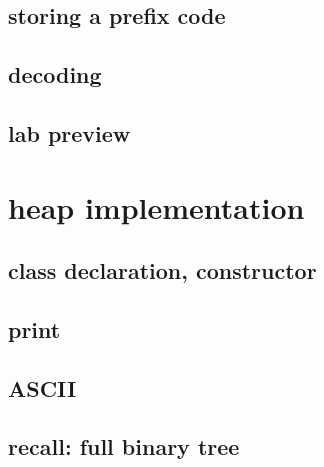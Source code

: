 



\subsection{storing a prefix code}



\subsection{decoding}



\subsection{lab preview}



\section{heap implementation}



\subsection{class declaration, constructor}




\subsection{print}



\subsection{ASCII}

\subsection{recall: full binary tree}


